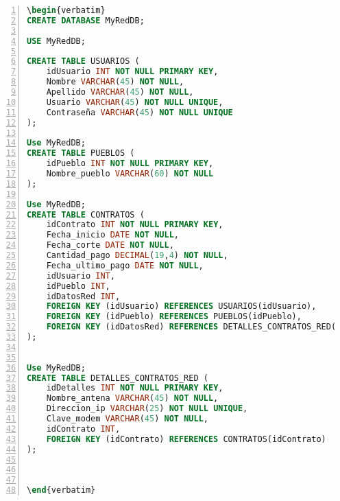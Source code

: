\begin{lstlisting}[language=Sql, basicstyle=\footnotesize\ttfamily, numbers=left]
\begin{verbatim}
CREATE DATABASE MyRedDB;

USE MyRedDB;

CREATE TABLE USUARIOS (
    idUsuario INT NOT NULL PRIMARY KEY,
    Nombre VARCHAR(45) NOT NULL,
    Apellido VARCHAR(45) NOT NULL,
    Usuario VARCHAR(45) NOT NULL UNIQUE,
    Contraseña VARCHAR(45) NOT NULL UNIQUE
);

Use MyRedDB; 
CREATE TABLE PUEBLOS (
    idPueblo INT NOT NULL PRIMARY KEY,
    Nombre_pueblo VARCHAR(60) NOT NULL
);

Use MyRedDB; 
CREATE TABLE CONTRATOS (
    idContrato INT NOT NULL PRIMARY KEY,
    Fecha_inicio DATE NOT NULL,
    Fecha_corte DATE NOT NULL,
    Cantidad_pago DECIMAL(19,4) NOT NULL,
    Fecha_ultimo_pago DATE NOT NULL,
    idUsuario INT,
    idPueblo INT,
    idDatosRed INT, 
    FOREIGN KEY (idUsuario) REFERENCES USUARIOS(idUsuario),
    FOREIGN KEY (idPueblo) REFERENCES PUEBLOS(idPueblo),
    FOREIGN KEY (idDatosRed) REFERENCES DETALLES_CONTRATOS_RED(idDetalles)
);


Use MyRedDB; 
CREATE TABLE DETALLES_CONTRATOS_RED (
    idDetalles INT NOT NULL PRIMARY KEY,
    Nombre_antena VARCHAR(45) NOT NULL,
    Direccion_ip VARCHAR(25) NOT NULL UNIQUE,
    Clave_modem VARCHAR(45) NOT NULL,
    idContrato INT,
    FOREIGN KEY (idContrato) REFERENCES CONTRATOS(idContrato)
);



\end{verbatim}
\end{lstlisting}